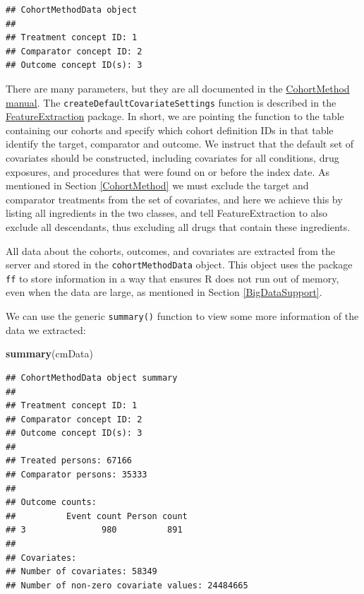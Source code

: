 \documentclass[11pt]{book}
\newenvironment{Shaded}{\begin{snugshade}}{\end{snugshade}}
\newcommand{\KeywordTok}[1]{\textcolor[rgb]{0.13,0.29,0.53}{\textbf{#1}}}
\newcommand{\NormalTok}[1]{#1}
\begin{document}
\begin{verbatim}
## CohortMethodData object
## 
## Treatment concept ID: 1
## Comparator concept ID: 2
## Outcome concept ID(s): 3
\end{verbatim}

There are many parameters, but they are all documented in the
\href{https://ohdsi.github.io/CohortMethod/reference/}{CohortMethod
manual}. The \texttt{createDefaultCovariateSettings} function is
described in the
\href{https://ohdsi.github.io/FeatureExtraction/}{FeatureExtraction}
package. In short, we are pointing the function to the table containing
our cohorts and specify which cohort definition IDs in that table
identify the target, comparator and outcome. We instruct that the
default set of covariates should be constructed, including covariates
for all conditions, drug exposures, and procedures that were found on or
before the index date. As mentioned in Section \ref{CohortMethod} we
must exclude the target and comparator treatments from the set of
covariates, and here we achieve this by listing all ingredients in the
two classes, and tell FeatureExtraction to also exclude all descendants,
thus excluding all drugs that contain these ingredients.

All data about the cohorts, outcomes, and covariates are extracted from
the server and stored in the \texttt{cohortMethodData} object. This
object uses the package \texttt{ff} to store information in a way that
ensures R does not run out of memory, even when the data are large, as
mentioned in Section \ref{BigDataSupport}.

We can use the generic \texttt{summary()} function to view some more
information of the data we extracted:

\begin{Shaded}
\begin{Highlighting}[]
\KeywordTok{summary}\NormalTok{(cmData)}
\end{Highlighting}
\end{Shaded}

\begin{verbatim}
## CohortMethodData object summary
## 
## Treatment concept ID: 1
## Comparator concept ID: 2
## Outcome concept ID(s): 3
## 
## Treated persons: 67166
## Comparator persons: 35333
## 
## Outcome counts:
##          Event count Person count
## 3               980          891
## 
## Covariates:
## Number of covariates: 58349
## Number of non-zero covariate values: 24484665
\end{verbatim}
\end{document}
